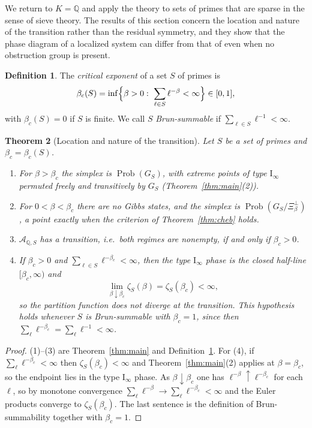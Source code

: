 \documentclass[11pt]{amsart}
\numberwithin{equation}{section}
\newtheorem{theorem}{Theorem}[section]
\theoremstyle{definition}
\newtheorem{definition}[theorem]{Definition}
\theoremstyle{remark}
\newcommand{\Q}{\mathbb{Q}}
\newcommand{\Prob}{\operatorname{Prob}}
\newcommand{\cA}{\mathcal{A}}
\begin{document}
We return to $K=\Q$ and apply the theory to sets of primes that are sparse in
the sense of sieve theory. The results of this section concern the location and
nature of the transition rather than the residual symmetry, and they show that
the phase diagram of a localized system can differ from that of \cite{BC} even
when no obstruction group is present.

\begin{definition}\label{def:betac}
The \emph{critical exponent} of a set $S$ of primes is
\[
\beta_c(S)=\inf\Bigl\{\beta>0:\ \sum_{\ell\in S}\ell^{-\beta}<\infty\Bigr\}\in[0,1],
\]
with $\beta_c(S)=0$ if $S$ is finite. We call $S$ \emph{Brun-summable} if
$\sum_{\ell\in S}\ell^{-1}<\infty$.
\end{definition}

\begin{theorem}[Location and nature of the transition]\label{thm:crit}
Let $S$ be a set of primes and $\beta_c=\beta_c(S)$.
\begin{enumerate}
\item For $\beta>\beta_c$ the simplex is $\Prob(G_S)$, with extreme points of
type $\mathrm I_\infty$ permuted freely and transitively by $G_S$
(Theorem~\ref{thm:main}(2)).
\item For $0<\beta<\beta_c$ there are no Gibbs states, and the simplex is
$\Prob(G_S/\Xi_\beta^\perp)$, a point exactly when the criterion of
Theorem~\ref{thm:cheb} holds.
\item $\cA_{\Q,S}$ has a transition, i.e.\ both regimes are nonempty, if and
only if $\beta_c>0$.
\item If $\beta_c>0$ and $\sum_{\ell\in S}\ell^{-\beta_c}<\infty$, then the
type $\mathrm I_\infty$ phase is the \emph{closed} half-line $[\beta_c,\infty)$
and
\[
\lim_{\beta\downarrow\beta_c}\zeta_S(\beta)=\zeta_S(\beta_c)<\infty ,
\]
so the partition function does not diverge at the transition. This hypothesis
holds whenever $S$ is Brun-summable with $\beta_c=1$, since then
$\sum_\ell\ell^{-\beta_c}=\sum_\ell\ell^{-1}<\infty$.
\end{enumerate}
\end{theorem}

\begin{proof}
(1)--(3) are Theorem~\ref{thm:main} and Definition~\ref{def:betac}. For (4), if
$\sum_\ell\ell^{-\beta_c}<\infty$ then $\zeta_S(\beta_c)<\infty$ and
Theorem~\ref{thm:main}(2) applies at $\beta=\beta_c$, so the endpoint lies in
the type $\mathrm I_\infty$ phase. As $\beta\downarrow\beta_c$ one has
$\ell^{-\beta}\uparrow\ell^{-\beta_c}$ for each $\ell$, so by monotone
convergence $\sum_\ell\ell^{-\beta}\to\sum_\ell\ell^{-\beta_c}<\infty$ and the
Euler products converge to $\zeta_S(\beta_c)$. The last sentence is the
definition of Brun-summability together with $\beta_c=1$.
\end{proof}
\end{document}
